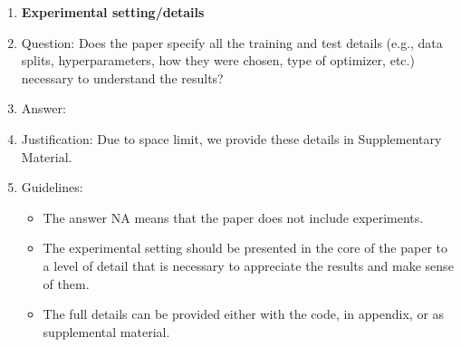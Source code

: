 \documentclass{article}
\begin{document}
\begin{enumerate}
\item {\bf Experimental setting/details}
    \item[] Question: Does the paper specify all the training and test details (e.g., data splits, hyperparameters, how they were chosen, type of optimizer, etc.) necessary to understand the results?
    \item[] Answer: \answerYes{} %
    \item[] Justification: Due to space limit, we provide these details in Supplementary Material.
    \item[] Guidelines:
    \begin{itemize}
        \item The answer NA means that the paper does not include experiments.
        \item The experimental setting should be presented in the core of the paper to a level of detail that is necessary to appreciate the results and make sense of them.
        \item The full details can be provided either with the code, in appendix, or as supplemental material.
    \end{itemize}


\end{enumerate}
\end{document}
